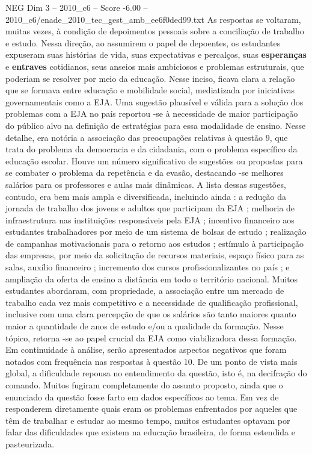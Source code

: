 \begin{textsample}{NEG Dim 3 – 2010\_c6 – Score -6.00 – 2010\_c6/enade\_2010\_tec\_gest\_amb\_ee6f0ded99.txt}
As respostas se voltaram, muitas vezes, à condição de depoimentos pessoais sobre a conciliação de trabalho e estudo.
Nessa direção, ao assumirem o papel de depoentes, os estudantes expuseram suas histórias de vida, suas expectativas e percalços, suas \textbf{esperanças} e \textbf{entraves} cotidianos, seus anseios mais ambiciosos e problemas estruturais, que poderiam se resolver por meio da educação.
Nesse inciso, ficava clara a relação que se formava entre educação e mobilidade social, mediatizada por iniciativas governamentais como a EJA.
Uma sugestão plausível e válida para a solução dos problemas com a EJA no país reportou -se à necessidade de maior participação do público alvo na definição de estratégias para essa modalidade de ensino.
Nesse detalhe, era notória a associação das preocupações relativas à questão 9, que trata do problema da democracia e da cidadania, com o problema específico da educação escolar.
Houve um número significativo de sugestões ou propostas para se combater o problema da repetência e da evasão, destacando -se melhores salários para os professores e aulas mais dinâmicas.
A lista dessas sugestões, contudo, era bem mais ampla e diversificada, incluindo ainda : a redução da jornada de trabalho dos jovens e adultos que participam da EJA ; melhoria de infraestrutura nas instituições responsáveis pela EJA ; incentivo financeiro aos estudantes trabalhadores por meio de um sistema de bolsas de estudo ; realização de campanhas motivacionais para o retorno aos estudos ; estímulo à participação das empresas, por meio da solicitação de recursos materiais, espaço físico para as salas, auxílio financeiro ; incremento dos cursos profissionalizantes no país ; e ampliação da oferta de ensino a distância em todo o território nacional.
Muitos estudantes abordaram, com propriedade, a associação entre um mercado de trabalho cada vez mais competitivo e a necessidade de qualificação profissional, inclusive com uma clara percepção de que os salários são tanto maiores quanto maior a quantidade de anos de estudo e/ou a qualidade da formação.
Nesse tópico, retorna -se ao papel crucial da EJA como viabilizadora dessa formação.
Em continuidade à análise, serão apresentados aspectos negativos que foram notados com frequência nas respostas à questão 10.
De um ponto de vista mais global, a dificuldade repousa no entendimento da questão, isto é, na decifração do comando.
Muitos fugiram completamente do assunto proposto, ainda que o enunciado da questão fosse farto em dados específicos ao tema.
Em vez de responderem diretamente quais eram os problemas enfrentados por aqueles que têm de trabalhar e estudar ao mesmo tempo, muitos estudantes optavam por falar das dificuldades que existem na educação brasileira, de forma estendida e pasteurizada.

\end{textsample}
